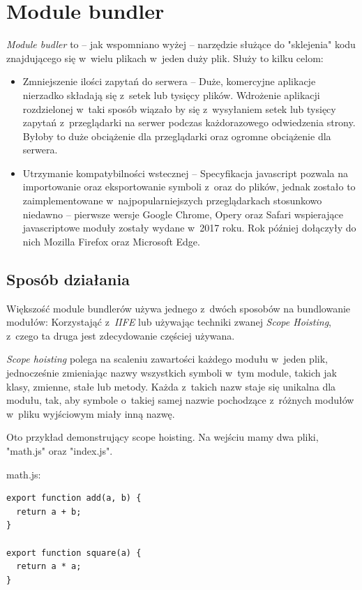 \documentclass{SGGW-thesis}
\begin{document}
\chapter{Module bundler}
\emph{Module budler} to -- jak wspomniano wyżej -- narzędzie służące do "sklejenia" kodu znajdującego się w~wielu plikach w~jeden duży plik. Służy to kilku celom:
\begin{itemize}
    \item Zmniejszenie ilości zapytań do serwera -- Duże, komercyjne aplikacje nierzadko składają się z~setek lub tysięcy plików. Wdrożenie aplikacji rozdzielonej w~taki sposób wiązało by się z~wysyłaniem setek lub tysięcy zapytań z~przeglądarki na serwer podczas każdorazowego odwiedzenia strony. Byłoby to duże obciążenie dla przeglądarki oraz ogromne obciążenie dla serwera.
    \item Utrzymanie kompatybilności wstecznej -- Specyfikacja javascript pozwala na importowanie oraz eksportowanie symboli z~oraz do plików, jednak zostało to zaimplementowane w~najpopularniejszych przeglądarkach stosunkowo niedawno -- pierwsze wersje Google Chrome, Opery oraz Safari wspierające javascriptowe moduły zostały wydane w~2017 roku. Rok później dołączyły do nich Mozilla Firefox oraz Microsoft Edge.\cite{es6_modules_support}
\end{itemize}


\section{Sposób działania}
Większość module bundlerów używa jednego z~dwóch sposobów na bundlowanie modułów: Korzystająć z~\emph{IIFE} lub używając techniki zwanej \emph{Scope Hoisting}, z~czego ta druga jest zdecydowanie częściej używana\cite{parcel_scope_hoisting}.

\emph{Scope hoisting} polega na scaleniu zawartości każdego modułu w~jeden plik, jednocześnie zmieniając nazwy wszystkich symboli w~tym module, takich jak klasy, zmienne, stałe lub metody. Każda z~takich nazw staje się unikalna dla modułu, tak, aby symbole o~takiej samej nazwie pochodzące z~różnych modułów w~pliku wyjściowym miały inną nazwę.

Oto przykład demonstrujący scope hoisting. Na wejściu mamy dwa pliki, "math.js" oraz "index.js".

math.js:
\begin{verbatim}
export function add(a, b) {
  return a + b;
}

export function square(a) {
  return a * a;
}
\end{verbatim}
\end{document}

